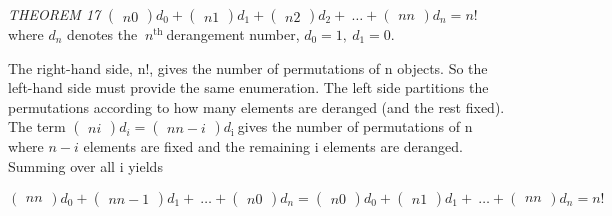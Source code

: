 \documentclass[10pt,letter]{article}
\begin{document}
\emph{THEOREM 17} \(

\begin{pmatrix}
n 
0 
\end{pmatrix}
d_{0} +

\begin{pmatrix}
n 
1 
\end{pmatrix}
d_{1} +

\begin{pmatrix}
n 
2 
\end{pmatrix}
d_{2} + \ \ldots +

\begin{pmatrix}
n 
n 
\end{pmatrix}
d_{n} = n!\) where \(d_{n}\) denotes the
\(\ n^{\text{th}}\ \)derangement number, \(d_{0} = 1,\ d_{1} = 0.\)

The right-hand side, n!, gives the number of permutations of n objects.
So the left-hand side must provide the same enumeration. The left side
partitions the permutations according to how many elements are deranged
(and the rest fixed). The term \(

\begin{pmatrix}
n 
i 
\end{pmatrix}
d_{i} =

\begin{pmatrix}
n 
n - i 
\end{pmatrix}
d_{\text{i\ }}\)gives the number of permutations of n where
\(n - i\) elements are fixed and the remaining i elements are deranged.
Summing over all i yields

\(

\begin{pmatrix}
n 
n 
\end{pmatrix}
d_{0} +

\begin{pmatrix}
n 
n - 1 
\end{pmatrix}
d_{1} + \ \ldots +

\begin{pmatrix}
n 
0 
\end{pmatrix}
d_{n} =

\begin{pmatrix}
n 
0 
\end{pmatrix}
d_{0} +

\begin{pmatrix}
n 
1 
\end{pmatrix}
d_{1} + \ \ldots +

\begin{pmatrix}
n 
n 
\end{pmatrix}
d_{n} = n!\)
\end{document}
